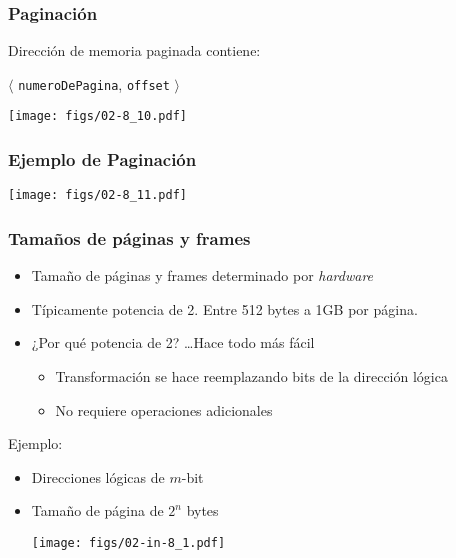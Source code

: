 \documentclass[letter]{beamer}
\begin{document}
\begin{frame}
  \frametitle{Paginación}

  Dirección de memoria paginada contiene:
  \begin{center}
    $\langle$ {\tt numeroDePagina}, {\tt offset} $\rangle$
  \end{center}

  \begin{center}
    \texttt{[image: figs/02-8\_10.pdf]}
  \end{center}


\end{frame} 
\begin{frame}
  \frametitle{Ejemplo de Paginación}

  \begin{center}
    \texttt{[image: figs/02-8\_11.pdf]}
  \end{center}
  

\end{frame}
\begin{frame}
  \frametitle{Tamaños de páginas y frames}

  \begin{itemize}
    \item Tamaño de páginas y frames determinado por {\em hardware}
    \item Típicamente potencia de 2. Entre 512 bytes a 1GB por página.
    \item ¿Por qué potencia de 2? \ldots Hace todo más fácil
      \begin{itemize}
        \item Transformación se hace reemplazando bits de la dirección lógica
        \item No requiere operaciones adicionales
      \end{itemize}
  \end{itemize}
  Ejemplo:
  \begin{itemize}
    \item Direcciones lógicas de $m$-bit
    \item Tamaño de página de $2^n$ bytes
      \begin{center}
        \texttt{[image: figs/02-in-8\_1.pdf]}
      \end{center}
  \end{itemize}
  
\end{frame}
\end{document}
